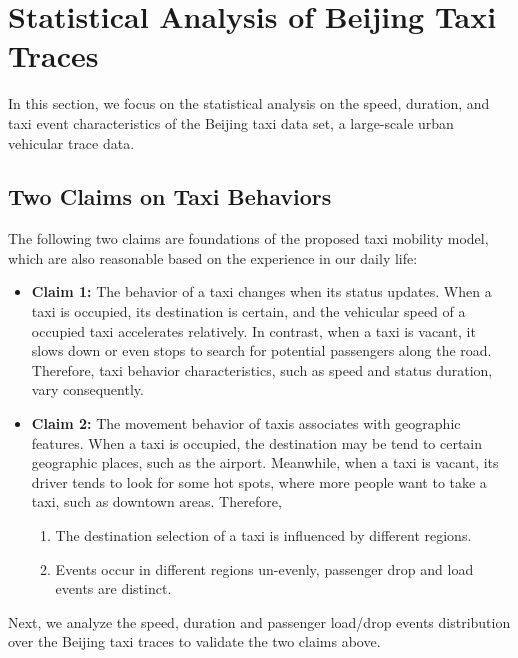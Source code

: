 \documentclass[10pt,conference,compsocconf,letterpaper]{IEEEtran}
\begin{document}


%

\section{Statistical Analysis of Beijing Taxi Traces}
\label{section_assumptions_anlysis}

In this section, we focus on the statistical analysis on the speed, duration, and taxi event characteristics of the Beijing taxi data set, a large-scale urban vehicular trace data.



\subsection{Two Claims on Taxi Behaviors}
\label{section_statistic_analysis}

The following two claims are foundations of the proposed taxi mobility model, which are also reasonable based on the experience in our daily life:
\begin{itemize}
  \item \textbf{Claim 1:} The behavior of a taxi changes when its status updates. When a taxi is occupied, its destination is certain, and the vehicular speed of a occupied taxi accelerates relatively. In contrast, when a taxi is vacant, it slows down or even stops to search for potential passengers along the road. Therefore, taxi behavior characteristics, such as speed and status duration, vary consequently.

  \item \textbf{Claim 2:} The movement behavior of taxis associates with geographic features. When a taxi is occupied, the destination may be tend to certain geographic places, such as the airport. Meanwhile, when a taxi is vacant, its driver tends to look for some hot spots, where more people want to take a taxi, such as downtown areas. Therefore,
      \begin{enumerate}
        \item The destination selection of a taxi is influenced by different regions.
        \item Events occur in different regions un-evenly, passenger drop and load events are distinct.
      \end{enumerate}
\end{itemize}
Next, we analyze the speed, duration and passenger load/drop events distribution over the Beijing taxi traces to validate the two claims above.
\end{document}
